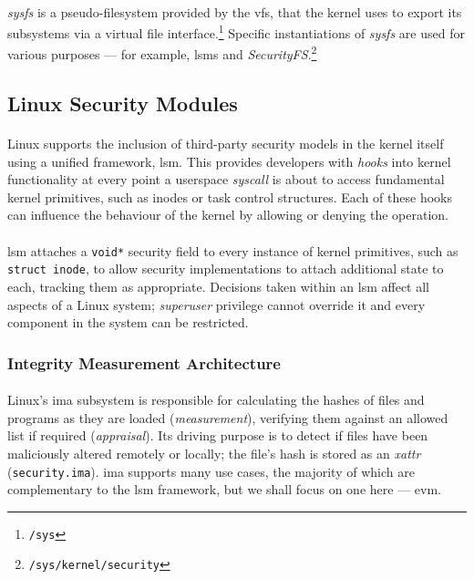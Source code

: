 \paragraph{} \textit{sysfs} is a pseudo-filesystem provided by the \acrshort{vfs}, that the kernel uses to export its subsystems via a virtual file interface.\footnote{\texttt{/sys}} Specific instantiations of \textit{sysfs} are used for various purposes --- for example, \acrshort{lsm}s and \textit{SecurityFS}.\footnote{\texttt{/sys/kernel/security}}



\subsection{Linux Security Modules}
\label{sec:lsm}

\paragraph{} Linux supports the inclusion of third-party security models in the kernel itself using a unified framework, \acrshort{lsm}. This provides developers with \textit{hooks} into kernel functionality at every point a userspace \textit{syscall} is about to access fundamental kernel primitives, such as inodes or task control structures. Each of these hooks can influence the behaviour of the kernel by allowing or denying the operation.

\paragraph{} \acrshort{lsm} attaches a \texttt{void*} security field to every instance of kernel primitives, such as \texttt{struct inode}, to allow security implementations to attach additional state to each, tracking them as appropriate. Decisions taken within an \acrshort{lsm} affect all aspects of a Linux system; \textit{superuser} privilege cannot override it and every component in the system can be restricted.


\subsubsection{Integrity Measurement Architecture}
\label{sec:ima}

\paragraph{} Linux's \acrshort{ima} subsystem is responsible for calculating the hashes of files and programs as they are loaded (\textit{measurement}), verifying them against an allowed list if required (\textit{appraisal}). Its driving purpose is to detect if files have been maliciously altered remotely or locally; the file's hash is stored as an \textit{\acrshort{xattr}} (\texttt{security.ima}). \acrshort{ima} supports many use cases, the majority of which are complementary to the \acrshort{lsm} framework, but we shall focus on one here --- \acrshort{evm}.


